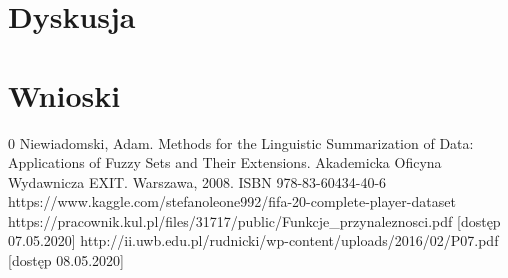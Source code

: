 \documentclass{classrep}
\begin{document}
	\section{Dyskusja} %
	
	\section{Wnioski}
		
	
	\begin{thebibliography} {0}
		 Niewiadomski, Adam. Methods for the Linguistic Summarization of Data: Applications of Fuzzy Sets and Their Extensions. Akademicka Oficyna Wydawnicza EXIT. Warszawa, 2008. ISBN 978-83-60434-40-6
		 https://www.kaggle.com/stefanoleone992/fifa-20-complete-player-dataset 
		 https://pracownik.kul.pl/files/31717/public/Funkcje\_przynaleznosci.pdf [dostęp 07.05.2020]
		 http://ii.uwb.edu.pl/rudnicki/wp-content/uploads/2016/02/P07.pdf [dostęp 08.05.2020]
	\end{thebibliography}
\end{document}
